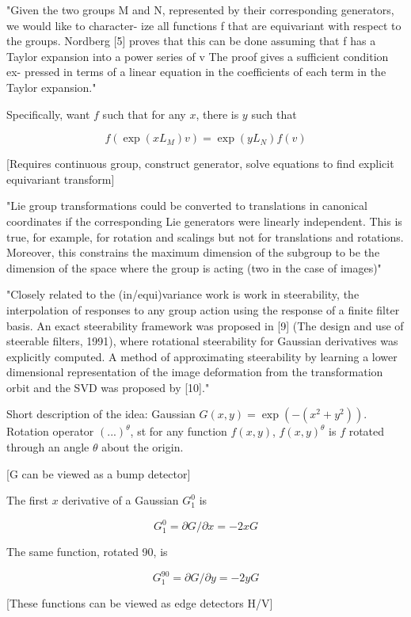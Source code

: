 \documentclass[english]{article}
\begin{document}
"Given the two groups M and N, represented by their
corresponding generators, we would like to character-
ize all functions f that are equivariant with respect to
the groups. Nordberg [5] proves that this can be done
assuming that f has a Taylor expansion into a power
series of v The proof gives a sufficient condition ex-
pressed in terms of a linear equation in the coefficients
of each term in the Taylor expansion."

Specifically, want $f$ such that for any $x$, there is $y$ such that

$$f(\exp(xL_M)v) = \exp(yL_N)f(v)$$

[Requires continuous group, construct generator, solve equations to find explicit equivariant transform]

"Lie group transformations could be converted to translations in
canonical coordinates if the corresponding Lie generators were linearly independent. This is true, for example, for rotation and scalings but not for translations and rotations. Moreover, this constrains the maximum
dimension of the subgroup to be the dimension of the space where the group is acting (two in the case of images)"

\item "Closely related to the (in/equi)variance work is work in steerability, the interpolation of responses to any
group action using the response of a finite filter basis. An exact steerability framework was proposed in [9] (The design and use of steerable filters, 1991),
where rotational steerability for Gaussian derivatives was explicitly computed. A method of approximating steerability by learning a lower dimensional representation of the image deformation from the transformation
orbit and the SVD was proposed by [10]."


Short description of the idea: Gaussian $G(x,y) = \exp(-(x^2+y^2))$. Rotation operator $(...)^\theta$, st for any function $f(x,y)$, $f(x,y)^\theta$ is $f$ rotated through an angle $\theta$ about the origin. 

[G can be viewed as a bump detector]

The first $x$ derivative of a Gaussian $G_1^0$ is 

$$G_1^0 = \partial G/\partial x = -2x G$$

The same function, rotated 90, is 

$$G_1^{90} = \partial G/\partial y = -2y G$$

[These functions can be viewed as edge detectors H/V]
\end{document}
